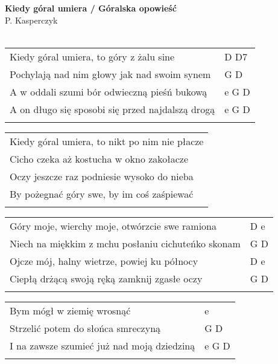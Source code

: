 \documentclass[a5paper]{article}
\begin{document}


\noindent
\fontsize{12pt}{15pt}\selectfont
\textbf{Kiedy góral umiera / Góralska opowieść} \\
\fontsize{8pt}{10pt}\selectfont
P. Kasperczyk \\ \\
\fontsize{10pt}{12pt}\selectfont
{}
\begin{tabular}{@{}p{9.5cm}p{3cm}@{}}
\noindent
Kiedy góral umiera, to góry z żalu sine & D D7 \\
Pochylają nad nim głowy jak nad swoim synem & G D \\
A w oddali szumi bór odwieczną pieśń bukową & e G D \\
A on długo się sposobi się przed najdalszą drogą & e G D \\ \\
\end{tabular}

\noindent
\begin{tabular}{@{}p{9.5cm}@{}}
Kiedy góral umiera, to nikt po nim nie płacze \\
Cicho czeka aż kostucha w okno zakołacze \\
Oczy jeszcze raz podniesie wysoko do nieba \\
By pożegnać góry swe, by im coś zaśpiewać \\ \\
\end{tabular}

\noindent
\begin{tabular}{@{}p{8.5cm}p{3cm}@{}}
Góry moje, wierchy moje, otwórzcie swe ramiona & D e \\
Niech na miękkim z mchu posłaniu cichuteńko skonam & G D \\
Ojcze mój, halny wietrze, powiej ku północy & D e \\
Ciepłą drżącą swoją ręką zamknij zgasłe oczy & G D \\ \\
\end{tabular}

\noindent
\begin{tabular}{@{}p{8.5cm}p{3cm}@{}}
Bym mógł w ziemię wrosnąć & e \\
Strzelić potem do słońca smreczyną & G D \\
I na zawsze szumieć już nad moją dziedziną & e G D \\ \\
\end{tabular}
\end{document}
